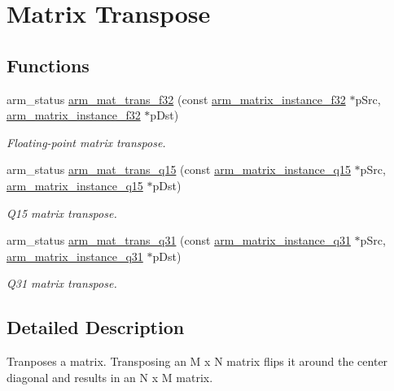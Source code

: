 \hypertarget{group___matrix_trans}{\section{Matrix Transpose}
\label{group___matrix_trans}
}
\subsection*{Functions}
\begin{DoxyCompactItemize}
\item 
arm\-\_\-status \hyperlink{group___matrix_trans_gad7dd9f108429da13d3864696ceeec789}{arm\-\_\-mat\-\_\-trans\-\_\-f32} (const \hyperlink{structarm__matrix__instance__f32}{arm\-\_\-matrix\-\_\-instance\-\_\-f32} $\ast$p\-Src, \hyperlink{structarm__matrix__instance__f32}{arm\-\_\-matrix\-\_\-instance\-\_\-f32} $\ast$p\-Dst)
\begin{DoxyCompactList}\small\item\em Floating-\/point matrix transpose. \end{DoxyCompactList}\item 
arm\-\_\-status \hyperlink{group___matrix_trans_ga4f4f821cc695fd0ef9061d702e08050a}{arm\-\_\-mat\-\_\-trans\-\_\-q15} (const \hyperlink{structarm__matrix__instance__q15}{arm\-\_\-matrix\-\_\-instance\-\_\-q15} $\ast$p\-Src, \hyperlink{structarm__matrix__instance__q15}{arm\-\_\-matrix\-\_\-instance\-\_\-q15} $\ast$p\-Dst)
\begin{DoxyCompactList}\small\item\em Q15 matrix transpose. \end{DoxyCompactList}\item 
arm\-\_\-status \hyperlink{group___matrix_trans_ga30a4d49489ac67ff98a46b9f58f73bf1}{arm\-\_\-mat\-\_\-trans\-\_\-q31} (const \hyperlink{structarm__matrix__instance__q31}{arm\-\_\-matrix\-\_\-instance\-\_\-q31} $\ast$p\-Src, \hyperlink{structarm__matrix__instance__q31}{arm\-\_\-matrix\-\_\-instance\-\_\-q31} $\ast$p\-Dst)
\begin{DoxyCompactList}\small\item\em Q31 matrix transpose. \end{DoxyCompactList}\end{DoxyCompactItemize}


\subsection{Detailed Description}
Tranposes a matrix. Transposing an {\ttfamily M x N} matrix flips it around the center diagonal and results in an {\ttfamily N x M} matrix.  

